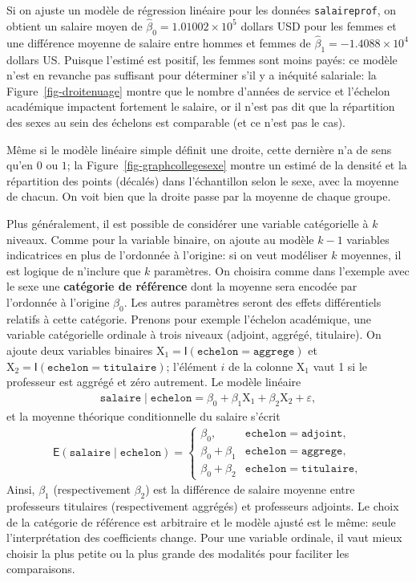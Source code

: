 \documentclass[
  11pt,
  letterpaper,
]{scrbook}
\theoremstyle{definition}
\theoremstyle{remark}
\begin{document}
Si on ajuste un modèle de régression linéaire pour les données
\texttt{salaireprof}, on obtient un salaire moyen de
\(\widehat{\beta}_0=\ensuremath{1.01002\times 10^{5}}\) dollars USD pour
les femmes et une différence moyenne de salaire entre hommes et femmes
de \(\widehat{\beta}_1=\ensuremath{-1.4088\times 10^{4}}\) dollars US.
Puisque l'estimé est positif, les femmes sont moins payés: ce modèle
n'est en revanche pas suffisant pour déterminer s'il y a inéquité
salariale: la Figure~\ref{fig-droitenuage} montre que le nombre d'années
de service et l'échelon académique impactent fortement le salaire, or il
n'est pas dit que la répartition des sexes au sein des échelons est
comparable (et ce n'est pas le cas).

Même si le modèle linéaire simple définit une droite, cette dernière n'a
de sens qu'en \(0\) ou \(1\); la Figure~\ref{fig-graphcollegesexe}
montre un estimé de la densité et la répartition des points (décalés)
dans l'échantillon selon le sexe, avec la moyenne de chacun. On voit
bien que la droite passe par la moyenne de chaque groupe.

Plus généralement, il est possible de considérer une variable
catégorielle à \(k\) niveaux. Comme pour la variable binaire, on ajoute
au modèle \(k-1\) variables indicatrices en plus de l'ordonnée à
l'origine: si on veut modéliser \(k\) moyennes, il est logique de
n'inclure que \(k\) paramètres. On choisira comme dans l'exemple avec le
sexe une \textbf{catégorie de référence} dont la moyenne sera encodée
par l'ordonnée à l'origine \(\beta_0\). Les autres paramètres seront des
effets différentiels relatifs à cette catégorie. Prenons pour exemple
l'échelon académique, une variable catégorielle ordinale à trois niveaux
(adjoint, aggrégé, titulaire). On ajoute deux variables binaires
\(\mathrm{X}_1 = \mathsf{I}(\texttt{echelon}=\texttt{aggrege})\) et
\(\mathrm{X}_2 = \mathsf{I}(\texttt{echelon}=\texttt{titulaire})\);
l'élément \(i\) de la colonne \(\mathrm{X}_1\) vaut 1 si le professeur
est aggrégé et zéro autrement. Le modèle linéaire \begin{align*}
\texttt{salaire} \mid \texttt{echelon}=\beta_0 + \beta_1 \mathrm{X}_1+\beta_2\mathrm{X}_2 + \varepsilon,
\end{align*} et la moyenne théorique conditionnelle du salaire s'écrit
\begin{align*}
\mathsf{E}(\texttt{salaire} \mid \texttt{echelon})= \begin{cases}
\beta_0, & \texttt{echelon}=\texttt{adjoint},\\
\beta_0 + \beta_1 & \texttt{echelon}=\texttt{aggrege},\\
\beta_0 + \beta_2 & \texttt{echelon}=\texttt{titulaire},
\end{cases}
\end{align*} Ainsi, \(\beta_1\) (respectivement \(\beta_2\)) est la
différence de salaire moyenne entre professeurs titulaires
(respectivement aggrégés) et professeurs adjoints. Le choix de la
catégorie de référence est arbitraire et le modèle ajusté est le même:
seule l'interprétation des coefficients change. Pour une variable
ordinale, il vaut mieux choisir la plus petite ou la plus grande des
modalités pour faciliter les comparaisons.
\end{document}
